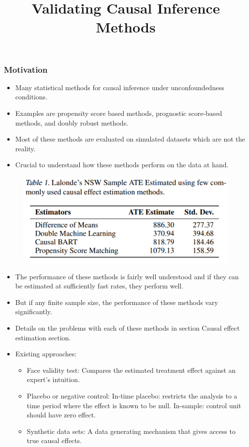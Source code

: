 \documentclass{beamer}
\begin{document}
\title[]{Validating Causal Inference Methods}
\author [] {}
\date{}

\begin{frame}
	\frametitle{Motivation}
	\begin{itemize}
		\item Many statistical methods for causal inference under unconfoundedness conditions.
		\item Examples are propensity score based methods, prognostic score-based methods, and doubly robust methods.
		\item Most of these methods are evaluated on simulated datasets which are not the reality.
		\item Crucial to understand how these methods perform on the data at hand.
	\end{itemize}
	\begin{figure}
		\includegraphics{imgs/comparison.png}
	\end{figure}
\end{frame}
\begin{frame}
	\begin{itemize}
		\item The performance of these methods is fairly well understood and if they can be estimated at sufficiently fast rates, they perform well.
		\item But if any finite sample size, the performance of these methods vary significantly.
		\item Details on the problems with each of these methods in section Causal effect estimation section.
		\item Existing approaches: 
			\begin{itemize}
				\item Face validity test: Compares the estimated treatment effect against an expert's intuition.
				\item Placebo or negative control: In-time placebo: restricts the analysis to a time period where the effect is known to be null. In-sample: control unit should have zero effect.
				\item Synthetic data sets: A data generating mechanism that gives access to true causal effects.
			\end{itemize}
	\end{itemize}
\end{frame}
\end{document}
